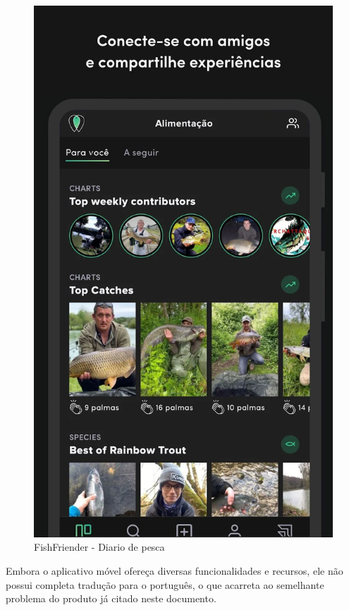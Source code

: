 \begin{figure}[H]
    \centering
    \caption{FishFriender - Diario de pesca}
    \label{fig:fishFrienderApp}
    \includegraphics[scale=0.25]{./dados/figuras/fish-friender-app-feed}
\end{figure}

Embora o aplicativo móvel ofereça diversas funcionalidades e recursos, ele não possui completa tradução para o português, o que acarreta ao semelhante problema do produto já citado neste documento.

